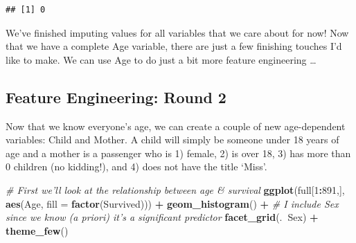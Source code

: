 \documentclass[]{book}
\newenvironment{Shaded}{\begin{snugshade}}{\end{snugshade}}
\newcommand{\KeywordTok}[1]{\textcolor[rgb]{0.13,0.29,0.53}{\textbf{#1}}}
\newcommand{\DataTypeTok}[1]{\textcolor[rgb]{0.13,0.29,0.53}{#1}}
\newcommand{\DecValTok}[1]{\textcolor[rgb]{0.00,0.00,0.81}{#1}}
\newcommand{\StringTok}[1]{\textcolor[rgb]{0.31,0.60,0.02}{#1}}
\newcommand{\CommentTok}[1]{\textcolor[rgb]{0.56,0.35,0.01}{\textit{#1}}}
\newcommand{\OperatorTok}[1]{\textcolor[rgb]{0.81,0.36,0.00}{\textbf{#1}}}
\newcommand{\NormalTok}[1]{#1}
\theoremstyle{definition}
\theoremstyle{definition}
\theoremstyle{definition}
\theoremstyle{remark}
\begin{document}
\begin{Shaded}
\end{Shaded}

\begin{verbatim}
## [1] 0
\end{verbatim}

We've finished imputing values for all variables that we care about for
now! Now that we have a complete Age variable, there are just a few
finishing touches I'd like to make. We can use Age to do just a bit more
feature engineering \ldots{}

\subsection{Feature Engineering: Round
2}\label{feature-engineering-round-2}

Now that we know everyone's age, we can create a couple of new
age-dependent variables: Child and Mother. A child will simply be
someone under 18 years of age and a mother is a passenger who is 1)
female, 2) is over 18, 3) has more than 0 children (no kidding!), and 4)
does not have the title `Miss'.

\begin{Shaded}
\begin{Highlighting}[]
\CommentTok{# First we'll look at the relationship between age & survival}
\KeywordTok{ggplot}\NormalTok{(full[}\DecValTok{1}\OperatorTok{:}\DecValTok{891}\NormalTok{,], }\KeywordTok{aes}\NormalTok{(Age, }\DataTypeTok{fill =} \KeywordTok{factor}\NormalTok{(Survived))) }\OperatorTok{+}\StringTok{ }
\StringTok{  }\KeywordTok{geom_histogram}\NormalTok{() }\OperatorTok{+}\StringTok{ }
\StringTok{  }\CommentTok{# I include Sex since we know (a priori) it's a significant predictor}
\StringTok{  }\KeywordTok{facet_grid}\NormalTok{(.}\OperatorTok{~}\NormalTok{Sex) }\OperatorTok{+}\StringTok{ }
\StringTok{  }\KeywordTok{theme_few}\NormalTok{()}
\end{Highlighting}
\end{Shaded}
\end{document}
